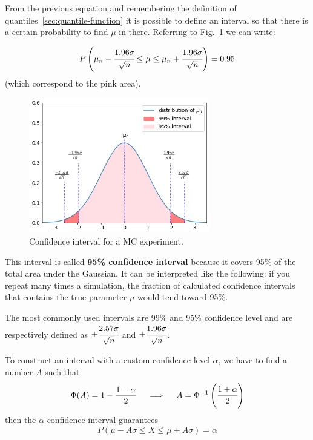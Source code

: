 From the previous equation and remembering the definition of quantiles~\ref{sec:quantile-function} it is possible to define an interval so that there is a certain probability to find $\mu$ in there. Referring to Fig.~\ref{fig:confidence_interval} we can write:

\begin{equation}
P\left(\mu_n - \cfrac{1.96\sigma}{\sqrt{n}}\le \mu \le \mu_n + \cfrac{1.96\sigma}{\sqrt{n}}\right) = 0.95
\end{equation}
(which correspond to the pink area).

\begin{figure}[htb]
\centering
\includegraphics[width=0.7\textwidth]{figures/confidence_interval}
\caption{Confidence interval for a MC experiment.}
\label{fig:confidence_interval}
\end{figure}

This interval is called \textbf{95\% confidence interval} because it covers 95\% of the total area under the Gaussian. It can be interpreted like the following: if you repeat many times a simulation, the fraction of calculated confidence intervals that contains the true parameter $\mu$ would tend toward 95\%.

The most commonly used intervals are 99\% and 95\% confidence level and are respectively defined as \(\pm \cfrac{2.57\sigma}{\sqrt{n}}\) and \(\pm \cfrac{1.96\sigma}{\sqrt{n}}\).

To construct an interval with a custom confidence level $\alpha$, we have to find a number $A$ such that
\begin{equation}
\Phi(A) = 1 - \frac{1-\alpha}{2}\quad\implies\quad A = \Phi^{-1}\left(\cfrac{1+\alpha}{2}\right)
\label{for:A}
\end{equation}
then the $\alpha$-confidence interval guarantees
\begin{equation}
P(\mu - A\sigma \le X \le \mu+ A\sigma) = \alpha 
\end{equation}


